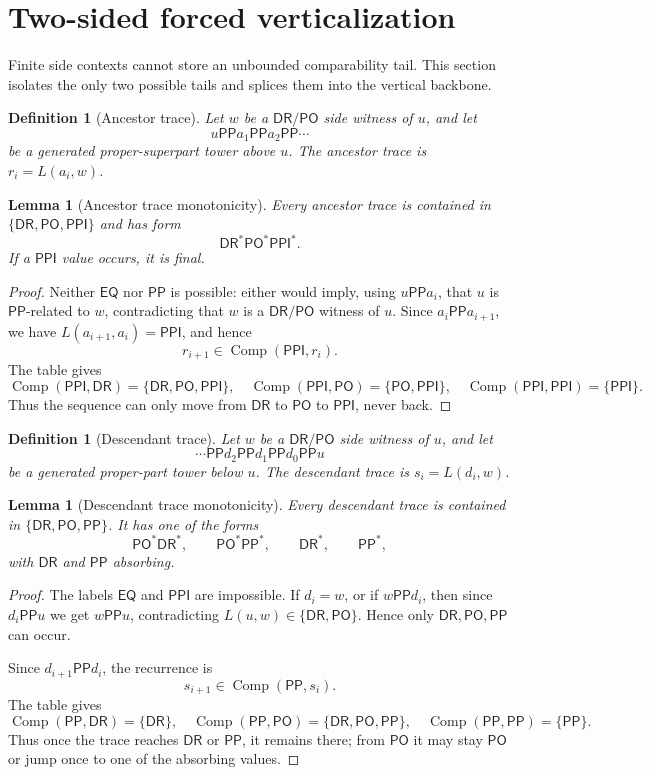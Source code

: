 \documentclass[11pt]{article}
\newtheorem{lemma}[theorem]{Lemma}
\newtheorem{definition}[theorem]{Definition}
\newcommand{\EQ}{\mathsf{EQ}}
\newcommand{\DR}{\mathsf{DR}}
\newcommand{\PO}{\mathsf{PO}}
\newcommand{\PP}{\mathsf{PP}}
\newcommand{\PPI}{\mathsf{PPI}}
\newcommand{\comp}{\operatorname{Comp}}
\begin{document}
\section{Two-sided forced verticalization}

Finite side contexts cannot store an unbounded comparability tail.  This section isolates the only two possible tails and splices them into the vertical backbone.

\begin{definition}[Ancestor trace]
Let $w$ be a $\DR/\PO$ side witness of $u$, and let
\[
   u\PP a_1\PP a_2\PP\cdots
\]
be a generated proper-superpart tower above $u$.  The ancestor trace is $r_i=L(a_i,w)$.
\end{definition}

\begin{lemma}[Ancestor trace monotonicity]
\label{lem:ancestor-trace}
Every ancestor trace is contained in $\{\DR,\PO,\PPI\}$ and has form
\[
  \DR^*\PO^*\PPI^*.
\]
If a $\PPI$ value occurs, it is final.
\end{lemma}

\begin{proof}
Neither $\EQ$ nor $\PP$ is possible: either would imply, using $u\PP a_i$, that $u$ is $\PP$-related to $w$, contradicting that $w$ is a $\DR/\PO$ witness of $u$.  Since $a_i\PP a_{i+1}$, we have $L(a_{i+1},a_i)=\PPI$, and hence
\[
 r_{i+1}\in\comp(\PPI,r_i).
\]
The table gives
\[
 \comp(\PPI,\DR)=\{\DR,\PO,\PPI\},\quad
 \comp(\PPI,\PO)=\{\PO,\PPI\},\quad
 \comp(\PPI,\PPI)=\{\PPI\}.
\]
Thus the sequence can only move from $\DR$ to $\PO$ to $\PPI$, never back.
\end{proof}

\begin{definition}[Descendant trace]
Let $w$ be a $\DR/\PO$ side witness of $u$, and let
\[
   \cdots\PP d_2\PP d_1\PP d_0\PP u
\]
be a generated proper-part tower below $u$.  The descendant trace is $s_i=L(d_i,w)$.
\end{definition}

\begin{lemma}[Descendant trace monotonicity]
\label{lem:descendant-trace}
Every descendant trace is contained in $\{\DR,\PO,\PP\}$.  It has one of the forms
\[
   \PO^*\DR^*,\qquad \PO^*\PP^*,\qquad \DR^*,\qquad \PP^*,
\]
with $\DR$ and $\PP$ absorbing.
\end{lemma}

\begin{proof}
The labels $\EQ$ and $\PPI$ are impossible.  If $d_i=w$, or if $w\PP d_i$, then since $d_i\PP u$ we get $w\PP u$, contradicting $L(u,w)\in\{\DR,\PO\}$.  Hence only $\DR,\PO,\PP$ can occur.

Since $d_{i+1}\PP d_i$, the recurrence is
\[
  s_{i+1}\in\comp(\PP,s_i).
\]
The table gives
\[
 \comp(\PP,\DR)=\{\DR\},\quad
 \comp(\PP,\PO)=\{\DR,\PO,\PP\},\quad
 \comp(\PP,\PP)=\{\PP\}.
\]
Thus once the trace reaches $\DR$ or $\PP$, it remains there; from $\PO$ it may stay $\PO$ or jump once to one of the absorbing values.
\end{proof}
\end{document}
